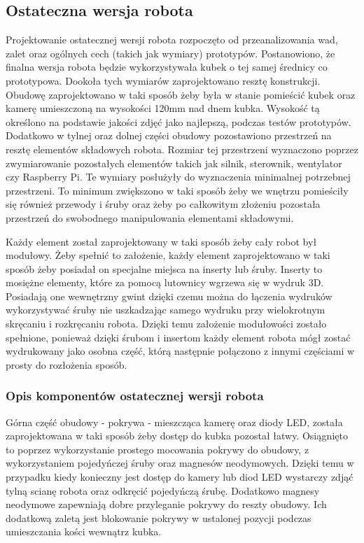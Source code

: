 \subsection{Ostateczna wersja robota}
Projektowanie ostatecznej wersji robota rozpoczęto od przeanalizowania wad, zalet oraz ogólnych cech (takich jak wymiary) prototypów.
Postanowiono, że finalna wersja robota będzie wykorzystywała kubek o tej samej średnicy co prototypowa. Dookoła tych wymiarów zaprojektowano 
resztę konstrukcji. Obudowę zaprojektowano w taki sposób żeby była w stanie pomieścić
kubek oraz kamerę umieszczoną na wysokości 120mm nad dnem kubka. Wysokość tą określono na podstawie jakości zdjęć jako najlepszą, podczas testów prototypów.
Dodatkowo w tylnej oraz dolnej części obudowy pozostawiono przestrzeń na resztę
elementów składowych robota. Rozmiar tej przestrzeni wyznaczono poprzez zwymiarowanie pozostałych elementów takich jak silnik, sterownik, wentylator 
czy Raspberry Pi. Te wymiary posłużyły do wyznaczenia minimalnej potrzebnej przestrzeni. To minimum zwiększono w taki sposób
żeby we wnętrzu pomieściły się również przewody i śruby oraz żeby po całkowitym złożeniu pozostała przestrzeń do swobodnego manipulowania
elementami składowymi.

Każdy element został zaprojektowany w taki sposób żeby cały robot był modułowy. Żeby spełnić to założenie, każdy element
zaprojektowano w taki sposób żeby posiadał on specjalne miejsca na inserty lub śruby. Inserty to mosiężne elementy, które za pomocą lutownicy wgrzewa się
w wydruk 3D. Posiadają one wewnętrzny gwint dzięki czemu można do łączenia wydruków wykorzystywać śruby nie uszkadzając samego wydruku przy 
wielokrotnym skręcaniu i rozkręcaniu robota. Dzięki temu założenie modułowości zostało spełnione, ponieważ dzięki śrubom i insertom każdy element robota 
mógł zostać wydrukowany jako osobna część, którą następnie połączono z innymi częściami w prosty do rozłożenia sposób.

\subsubsection{Opis komponentów ostatecznej wersji robota}

Górna część obudowy - pokrywa - mieszcząca kamerę oraz diody LED, została zaprojektowana w taki sposób żeby dostęp do kubka pozostał łatwy. Osiągnięto to
poprzez wykorzystanie prostego mocowania pokrywy do obudowy, z wykorzystaniem pojedyńczej śruby oraz magnesów neodymowych. Dzięki temu w przypadku kiedy konieczny 
jest dostęp do kamery lub diod LED wystarczy zdjąć tylną scianę robota oraz odkręcić pojedyńczą śrubę. Dodatkowo magnesy neodymowe zapewniają
dobre przyleganie pokrywy do reszty obudowy. Ich dodatkową zaletą jest blokowanie pokrywy w ustalonej pozycji podczas umieszczania kości wewnątrz
kubka.

